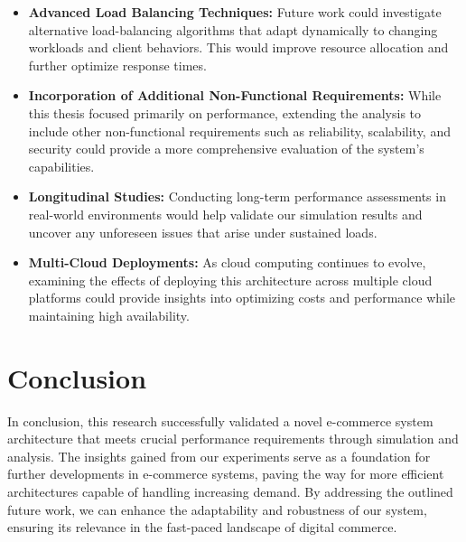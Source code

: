 \begin{itemize}
    \item \textbf{Advanced Load Balancing Techniques:} Future work could investigate alternative load-balancing algorithms that adapt dynamically to changing workloads and client behaviors. This would improve resource allocation and further optimize response times.

    \item \textbf{Incorporation of Additional Non-Functional Requirements:} While this thesis focused primarily on performance, extending the analysis to include other non-functional requirements such as reliability, scalability, and security could provide a more comprehensive evaluation of the system's capabilities.

    \item \textbf{Longitudinal Studies:} Conducting long-term performance assessments in real-world environments would help validate our simulation results and uncover any unforeseen issues that arise under sustained loads.

    \item \textbf{Multi-Cloud Deployments:} As cloud computing continues to evolve, examining the effects of deploying this architecture across multiple cloud platforms could provide insights into optimizing costs and performance while maintaining high availability.
\end{itemize}

\section{Conclusion}

In conclusion, this research successfully validated a novel e-commerce system architecture that meets crucial performance requirements through simulation and analysis. The insights gained from our experiments serve as a foundation for further developments in e-commerce systems, paving the way for more efficient architectures capable of handling increasing demand. By addressing the outlined future work, we can enhance the adaptability and robustness of our system, ensuring its relevance in the fast-paced landscape of digital commerce.
